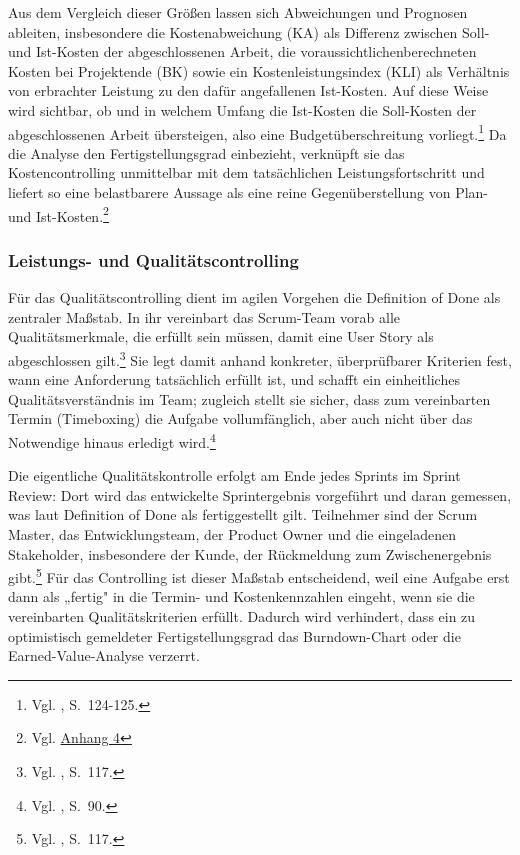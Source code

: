 \documentclass[
    12pt, 
    a4paper,
    ]{scrartcl} %
\begin{document}
Aus dem Vergleich dieser Größen lassen sich Abweichungen und Prognosen ableiten, insbesondere die Kostenabweichung (KA) als Differenz zwischen Soll- und Ist-Kosten der abgeschlossenen Arbeit, die voraussichtlichenberechneten Kosten bei Projektende (BK) sowie ein Kostenleistungsindex (KLI) als Verhältnis von erbrachter Leistung zu den dafür angefallenen Ist-Kosten. Auf diese Weise wird sichtbar, ob und in welchem Umfang die Ist-Kosten die Soll-Kosten der abgeschlossenen Arbeit übersteigen, also eine Budgetüberschreitung vorliegt.\footnote{Vgl. \cite{Mayrhofer_HybridesProjektmanagement}, S.~124-125.} Da die Analyse den Fertigstellungsgrad einbezieht, verknüpft sie das Kostencontrolling unmittelbar mit dem tatsächlichen Leistungsfortschritt und liefert so eine belastbarere Aussage als eine reine Gegenüberstellung von Plan- und Ist-Kosten.\footnote{Vgl. \hyperref[sec:Anhang4]{Anhang 4}}

\subsubsection{Leistungs- und Qualitätscontrolling}
Für das Qualitätscontrolling dient im agilen Vorgehen die Definition of Done als zentraler Maßstab. In ihr vereinbart das Scrum-Team vorab alle Qualitätsmerkmale, die erfüllt sein müssen, damit eine User Story als abgeschlossen gilt.\footnote{Vgl. \cite{Beiderwieden_ProjektmanagementIT}, S.~117.} Sie legt damit anhand konkreter, überprüfbarer Kriterien fest, wann eine Anforderung tatsächlich erfüllt ist, und schafft ein einheitliches Qualitätsverständnis im Team; zugleich stellt sie sicher, dass zum vereinbarten Termin (Timeboxing) die Aufgabe vollumfänglich, aber auch nicht über das Notwendige hinaus erledigt wird.\footnote{Vgl. \cite{Lang_Schops_Praxisleitfaden}, S.~90.}

Die eigentliche Qualitätskontrolle erfolgt am Ende jedes Sprints im Sprint Review: Dort wird das entwickelte Sprintergebnis vorgeführt und daran gemessen, was laut Definition of Done als fertiggestellt gilt. Teilnehmer sind der Scrum Master, das Entwicklungsteam, der Product Owner und die eingeladenen Stakeholder, insbesondere der Kunde, der Rückmeldung zum Zwischenergebnis gibt.\footnote{Vgl. \cite{Beiderwieden_ProjektmanagementIT}, S.~117.} Für das Controlling ist dieser Maßstab entscheidend, weil eine Aufgabe erst dann als „fertig" in die Termin- und Kostenkennzahlen eingeht, wenn sie die vereinbarten Qualitätskriterien erfüllt. Dadurch wird verhindert, dass ein zu optimistisch gemeldeter Fertigstellungsgrad das Burndown-Chart oder die Earned-Value-Analyse verzerrt.
\end{document}
